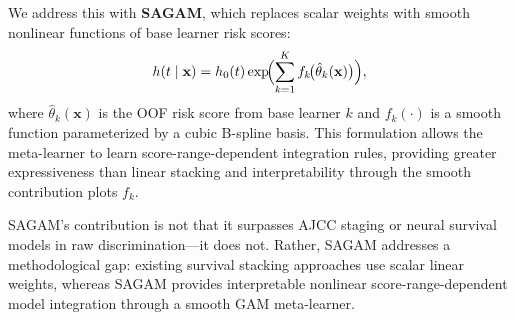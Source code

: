 \documentclass[conference]{IEEEtran}
\begin{document}
We address this with \textbf{SAGAM}, which replaces scalar weights with
smooth nonlinear functions of base learner risk scores:
\begin{equation}
  h(t \mid \mathbf{x}) = h_0(t)
    \exp\!\Bigl(\sum_{k=1}^{K} f_k\!\bigl(\hat{\theta}_k(\mathbf{x})\bigr)\Bigr),
  \label{eq:sagam}
\end{equation}
where $\hat{\theta}_k(\mathbf{x})$ is the OOF risk score from base
learner $k$ and $f_k(\cdot)$ is a smooth function parameterized by a
cubic B-spline basis.
This formulation allows the meta-learner to learn score-range-dependent
integration rules, providing greater expressiveness than linear stacking
and interpretability through the smooth contribution plots $f_k$.

SAGAM's contribution is not that it surpasses AJCC staging or neural
survival models in raw discrimination---it does not.
Rather, SAGAM addresses a methodological gap: existing survival stacking
approaches use scalar linear weights, whereas SAGAM provides interpretable
nonlinear score-range-dependent model integration through a smooth GAM
meta-learner.
\end{document}
